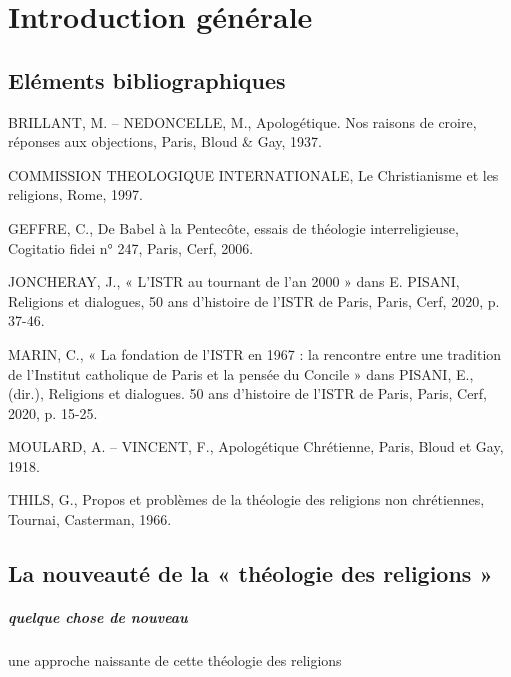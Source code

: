 \chapter{Introduction générale}

\section{Eléments bibliographiques}
\bi

\item BRILLANT, M. – NEDONCELLE, M., Apologétique. Nos raisons de croire, réponses aux
objections, Paris, Bloud \& Gay, 1937.
\item COMMISSION THEOLOGIQUE INTERNATIONALE, Le Christianisme et les religions,
Rome, 1997.
\item GEFFRE, C., De Babel à la Pentecôte, essais de théologie interreligieuse, Cogitatio fidei n°
247, Paris, Cerf, 2006.
\item JONCHERAY, J., « L’ISTR au tournant de l’an 2000 » dans E. PISANI, Religions et
dialogues, 50 ans d’histoire de l’ISTR de Paris, Paris, Cerf, 2020, p. 37-46.
\item MARIN, C., « La fondation de l’ISTR en 1967 : la rencontre entre une tradition de l’Institut
catholique de Paris et la pensée du Concile » dans PISANI, E., (dir.), Religions et
dialogues. 50 ans d’histoire de l’ISTR de Paris, Paris, Cerf, 2020, p. 15-25.
\item MOULARD, A. – VINCENT, F., Apologétique Chrétienne, Paris, Bloud et Gay, 1918.
\item THILS, G., Propos et problèmes de la théologie des religions non chrétiennes, Tournai,
Casterman, 1966.
\ei

\section{La nouveauté de la « théologie des religions »}




\paragraph{quelque chose de nouveau} une approche naissante de cette théologie des religions

